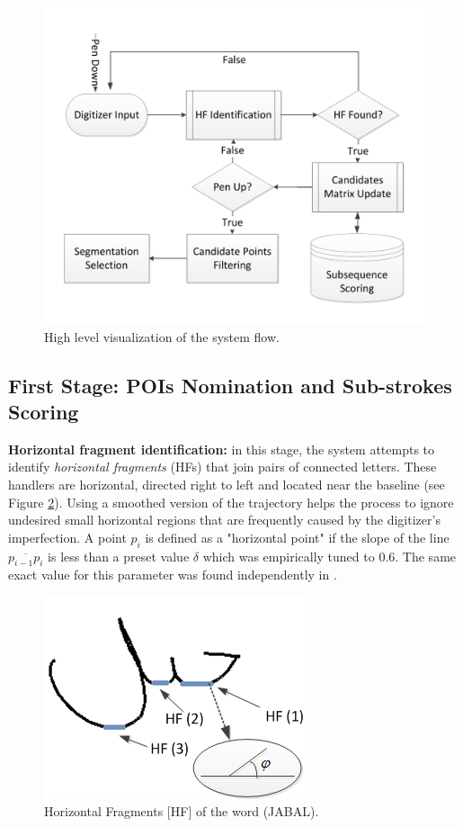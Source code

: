 \documentclass[10pt, conference, compsocconf]{IEEEtran}
\begin{document}
\begin{figure}
\centering
\includegraphics[width=0.9\columnwidth]{./figures/system_flow}
\caption{High level visualization of the system flow.}
\label{fig:system_flow}
\end{figure}

\subsection{First Stage: POIs Nomination and Sub-strokes Scoring}

\textbf{Horizontal fragment identification:} in this stage, the system attempts to identify \emph{horizontal fragments} (HFs) that join pairs of connected letters. 
These handlers are horizontal, directed right to left and located near the baseline (see Figure  \ref{fig:horizontal_fragments}). 
Using a smoothed version of the trajectory helps the process to ignore undesired small horizontal regions that are frequently caused by the digitizer's imperfection.  
A point $p_{i}$ is defined as a "horizontal point" if the slope of the line $\overline{p_{i-1}p_{i}}$ is less than a preset value $\delta$ which was empirically tuned to $0.6$. The same exact value for this parameter was found independently in \cite{daifallah2009recognition}.\\

\begin{figure}
\centering
\includegraphics[width=0.5\columnwidth]{./figures/horizontal_fragments}
\caption{Horizontal Fragments [HF] of the word  (JABAL).}
\label{fig:horizontal_fragments}
\end{figure}
\end{document}
